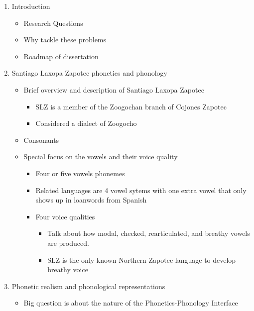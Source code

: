\documentclass[12pt, letterpaper]{article}
\begin{document}
\begin{enumerate}
    \item Introduction
    \begin{itemize}
        \item Research Questions
        \item Why tackle these problems
        \item Roadmap of dissertation
    \end{itemize}
    \item Santiago Laxopa Zapotec phonetics and phonology
    \begin{itemize}
        \item Brief overview and description of Santiago Laxopa Zapotec
        \begin{itemize}
            \item SLZ is a member of the Zoogochan branch of Cojones Zapotec
            \item Considered a dialect of Zoogocho \citep{smith-starkAlgunasIsoglosasZapotecas2003}
        \end{itemize}
        \item Consonants
        \item Special focus on the vowels and their voice quality
        \begin{itemize}
            \item Four or five vowels phonemes
            \item Related languages are 4 vowel sytems with one extra vowel that only shows up in loanwords from Spanish \citep{sonnenscheinDescriptiveGrammarSan2004,sonnenscheinDescriptiveGrammarSan2005, avelinobecerraTopicsYalalagZapotec2004}
            \item Four voice qualities
            \begin{itemize}
                \item Talk about how modal, checked, rearticulated, and breathy vowels are produced.
                \item SLZ is the only known Northern Zapotec language to develop breathy voice \citep[c.f.,][]{ariza-garciaPhonationTypesTones2018} 
            \end{itemize} 
        \end{itemize}
    \end{itemize}
    \item Phonetic realism and phonological representations
    \begin{itemize}
        \item Big question is about the nature of the Phonetics-Phonology Interface \citep{kennedyPhoneticsPhonologyInterface2021}

\end{itemize}
\end{enumerate}
\end{document}
